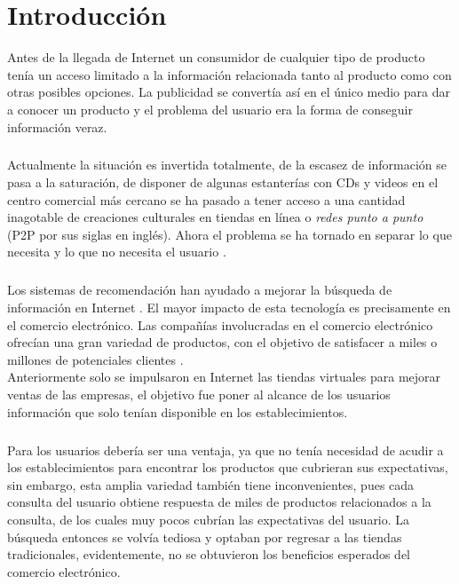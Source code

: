 \documentclass[12pt,letterpaper,oneside] {memoir}
\begin{document}
\tableofcontents* 
\clearpage
\listoffigures
\clearpage
\listoftables
\mainmatter

\chapter{Introducción}

Antes de la llegada de Internet un consumidor de cualquier tipo de producto tenía un acceso limitado a la información relacionada tanto al producto como con otras posibles opciones. La publicidad se convertía así en el único medio para dar a conocer un producto y el problema del usuario era la forma de conseguir información veraz. 
\paragraph{}
Actualmente la situación es invertida totalmente,  de la escasez de información se pasa a la saturación, de disponer de algunas estanterías con CDs y  videos en el centro comercial más cercano se ha pasado a tener acceso a una cantidad inagotable de creaciones culturales en tiendas en línea o \textit{redes punto a punto} (P2P por sus siglas en inglés). Ahora el problema se ha tornado en separar lo que necesita y lo que no necesita el usuario \cite{GalanNieto1994}.
\paragraph{}
Los sistemas de recomendación han ayudado a mejorar la búsqueda de información en Internet \cite{Rucker1997}.  %
El mayor impacto de esta tecnología es precisamente en el comercio electrónico. Las compañías involucradas en el comercio electrónico ofrecían una gran variedad de productos, con el objetivo de satisfacer a miles o millones de potenciales clientes \cite{GarciaGil2007}.\\
Anteriormente solo se impulsaron en Internet las tiendas virtuales para mejorar ventas de las empresas, el objetivo fue poner al alcance de los usuarios información que solo tenían disponible en los establecimientos.  
\paragraph{}
Para los usuarios debería ser una ventaja, ya que no tenía necesidad de acudir a los establecimientos para encontrar los productos que cubrieran sus expectativas, sin embargo, esta amplia variedad  también tiene inconvenientes, pues cada consulta del usuario obtiene respuesta de miles de productos relacionados a la consulta, de los cuales muy pocos cubrían las expectativas del usuario. La búsqueda entonces se volvía tediosa y optaban por regresar a las tiendas tradicionales, evidentemente,  no se obtuvieron los beneficios esperados del comercio electrónico.
\end{document}
